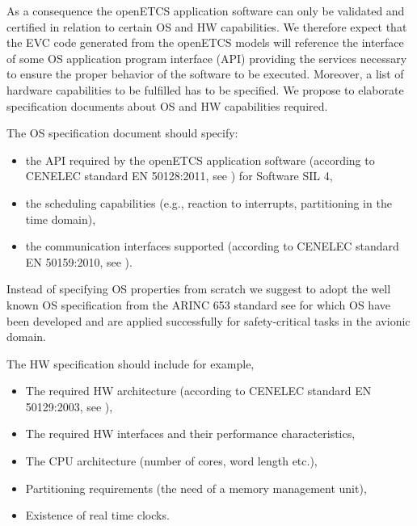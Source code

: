 \documentclass{template/openetcs_report}
\begin{document}
As a consequence the openETCS application software can only be validated and certified in relation to certain OS and HW capabilities.
We therefore expect that the EVC code generated from the openETCS models will reference the interface of some OS application program interface (API) providing the services necessary to ensure the proper behavior of the software to be executed. Moreover, a list of hardware capabilities to be fulfilled has to be specified. 
We propose to elaborate specification documents about OS and HW capabilities required. 

The OS specification document should specify:
\begin{itemize}\itemsep=0pt
  \item the API required by the openETCS application software (according to CENELEC standard EN 50128:2011, see \cite{EN50159}) for Software SIL 4,
  \item the scheduling capabilities (e.g., reaction to interrupts, partitioning in the time domain),
  \item the communication interfaces supported (according to CENELEC standard EN 50159:2010, see \cite{EN50159}).
\end{itemize}

Instead of specifying OS properties from scratch we suggest to adopt the well known OS specification from the ARINC 653 standard see \cite{ARINC} for which OS have been developed and are applied successfully for safety-critical tasks in the avionic domain.

The HW specification should include for example,
\begin{itemize}\itemsep=0pt
  \item The required HW architecture (according to CENELEC standard EN 50129:2003, see \cite{EN50129}),
  \item The required HW interfaces and their performance characteristics,
  \item The CPU architecture (number of cores, word length etc.),
  \item Partitioning requirements (the need of a memory management unit),
  \item Existence of real time clocks.
\end{itemize}
\end{document}
